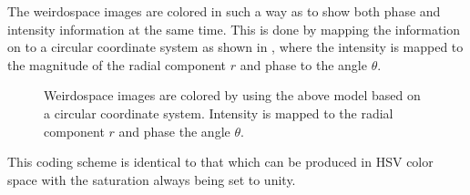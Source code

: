 The weirdospace images are colored in such a way as to show both phase and
intensity information at the same time.  This is done by mapping the
information on to a circular coordinate system as shown in , where the intensity is mapped to the magnitude of the radial
component $r$ and phase to the angle $\theta$.  
\begin{figure}[ht]
\centering
\caption{Weirdospace images are colored by using the above model based on a
circular coordinate system.  Intensity is mapped to the radial component
$r$ and phase the angle $\theta$.}
\label{fig:hsv}
\end{figure}
This coding scheme is identical to that which can be produced in HSV color
space with the saturation always being set to unity.

